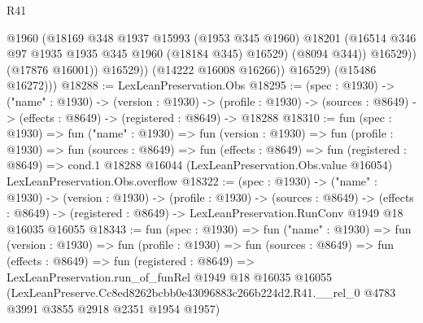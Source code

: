 \begin{lexlean}{R41}
\begin{coremodule}
                      @1960
                      (@18169
                        @348
                        @1937
                        @15993
                        (@1953 @345 @1960)
                        @18201
                        (@16514 @346 @97 @1935 @1935 @345 @1960 (@18184 @345) @16529)
                        (@8094 @344))
                      @16529))
                  (@17876 @16001))
                @16529))
            (@14222 @16008 @16266))
          @16529)
        (@15486 @16272)))
@18288 := LexLeanPreservation.Obs
@18295 := (spec : @1930) ->
  ("name" : @1930) ->
  (version : @1930) ->
  (profile : @1930) -> (sources : @8649) -> (effects : @8649) -> (registered : @8649) -> @18288
@18310 := fun (spec : @1930) =>
  fun ("name" : @1930) =>
  fun (version : @1930) =>
  fun (profile : @1930) =>
  fun (sources : @8649) =>
  fun (effects : @8649) =>
  fun (registered : @8649) =>
  cond.{1} @18288 @16044 (LexLeanPreservation.Obs.value @16054) LexLeanPreservation.Obs.overflow
@18322 := (spec : @1930) ->
  ("name" : @1930) ->
  (version : @1930) ->
  (profile : @1930) ->
  (sources : @8649) ->
  (effects : @8649) -> (registered : @8649) -> LexLeanPreservation.RunConv @1949 @18 @16035 @16055
@18343 := fun (spec : @1930) =>
  fun ("name" : @1930) =>
  fun (version : @1930) =>
  fun (profile : @1930) =>
  fun (sources : @8649) =>
  fun (effects : @8649) =>
  fun (registered : @8649) =>
  LexLeanPreservation.run_of_funRel
    @1949
    @18
    @16035
    @16055
    (LexLeanPreserve.Cc8ed8262bcbb0e43096883c266b224d2.R41.__rel_0
      @4783
      @3991
      @3855
      @2918
      @2351
      @1954
      @1957)
\end{coremodule}
\end{lexlean}

